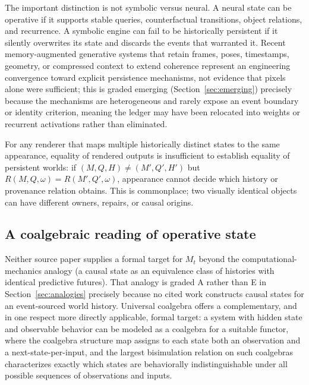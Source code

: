 \documentclass[11pt]{article}
\begin{document}
The important distinction is not symbolic versus neural. A neural state can be operative if it supports stable queries, counterfactual transitions, object relations, and recurrence. A symbolic engine can fail to be historically persistent if it silently overwrites its state and discards the events that warranted it. Recent memory-augmented generative systems that retain frames, poses, timestamps, geometry, or compressed context to extend coherence represent an engineering convergence toward explicit persistence mechanisms, not evidence that pixels alone were sufficient; this is graded emerging (Section~\ref{sec:emerging}) precisely because the mechanisms are heterogeneous and rarely expose an event boundary or identity criterion, meaning the ledger may have been relocated into weights or recurrent activations rather than eliminated.

For any renderer that maps multiple historically distinct states to the same appearance, equality of rendered outputs is insufficient to establish equality of persistent worlds: if $(M, Q, H) \neq (M', Q', H')$ but $R(M, Q, \omega) = R(M', Q', \omega)$, appearance cannot decide which history or provenance relation obtains. This is commonplace; two visually identical objects can have different owners, repairs, or causal origins.

\subsection{A coalgebraic reading of operative state}
\label{sec:coalgebra}

Neither source paper supplies a formal target for $M_t$ beyond the computational-mechanics analogy (a causal state as an equivalence class of histories with identical predictive futures). That analogy is graded A rather than E in Section~\ref{sec:analogies} precisely because no cited work constructs causal states for an event-sourced world history. Universal coalgebra offers a complementary, and in one respect more directly applicable, formal target: a system with hidden state and observable behavior can be modeled as a coalgebra for a suitable functor, where the coalgebra structure map assigns to each state both an observation and a next-state-per-input, and the largest bisimulation relation on such coalgebras characterizes exactly which states are behaviorally indistinguishable under all possible sequences of observations and inputs.
\end{document}
